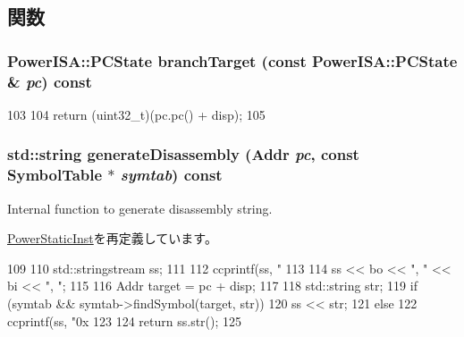 \subsection{関数}
\hypertarget{classPowerISA_1_1BranchPCRelCond_a860401b0a6432ac5dbe246c64448d56d}{
\subsubsection[{branchTarget}]{\setlength{\rightskip}{0pt plus 5cm}PowerISA::PCState branchTarget (const PowerISA::PCState \& {\em pc}) const}}
\label{classPowerISA_1_1BranchPCRelCond_a860401b0a6432ac5dbe246c64448d56d}



\begin{DoxyCode}
103 {
104     return (uint32_t)(pc.pc() + disp);
105 }
\end{DoxyCode}
\hypertarget{classPowerISA_1_1BranchPCRelCond_a95d323a22a5f07e14d6b4c9385a91896}{
\subsubsection[{generateDisassembly}]{\setlength{\rightskip}{0pt plus 5cm}std::string generateDisassembly ({\bf Addr} {\em pc}, \/  const SymbolTable $\ast$ {\em symtab}) const}}
\label{classPowerISA_1_1BranchPCRelCond_a95d323a22a5f07e14d6b4c9385a91896}
Internal function to generate disassembly string. 

\hyperlink{classPowerISA_1_1PowerStaticInst_a95d323a22a5f07e14d6b4c9385a91896}{PowerStaticInst}を再定義しています。


\begin{DoxyCode}
109 {
110     std::stringstream ss;
111 
112     ccprintf(ss, "%
113 
114     ss << bo << ", " << bi << ", ";
115 
116     Addr target = pc + disp;
117 
118     std::string str;
119     if (symtab && symtab->findSymbol(target, str))
120         ss << str;
121     else
122         ccprintf(ss, "0x%
123 
124     return ss.str();
125 }
\end{DoxyCode}



